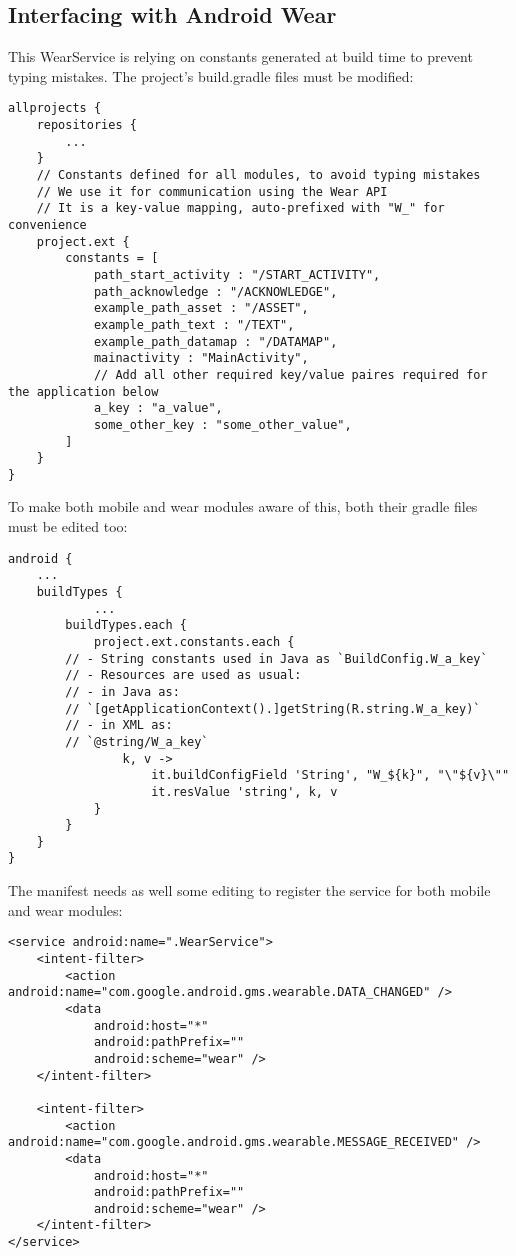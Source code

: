 \documentclass[11pt]{article}
\begin{document}
\subsection{Interfacing with Android Wear}
This WearService is relying on constants generated at build time to prevent typing mistakes. The project’s build.gradle files must be modified:
\lstset{language = Java}
\begin{lstlisting}
allprojects {
    repositories {
        ...
    }
    // Constants defined for all modules, to avoid typing mistakes
    // We use it for communication using the Wear API
    // It is a key-value mapping, auto-prefixed with "W_" for convenience
    project.ext {
        constants = [
            path_start_activity : "/START_ACTIVITY",
            path_acknowledge : "/ACKNOWLEDGE",
            example_path_asset : "/ASSET",
            example_path_text : "/TEXT",
            example_path_datamap : "/DATAMAP",
            mainactivity : "MainActivity",
            // Add all other required key/value paires required for the application below
            a_key : "a_value",
            some_other_key : "some_other_value",
        ]
    }
}
\end{lstlisting}
To make both mobile and wear modules aware of this, both their gradle files must be edited too: 
\lstset{language = Java}
\begin{lstlisting}
android {
    ...
    buildTypes {
            ...
        buildTypes.each {
            project.ext.constants.each {
        // - String constants used in Java as `BuildConfig.W_a_key`
        // - Resources are used as usual:
        // - in Java as:
        // `[getApplicationContext().]getString(R.string.W_a_key)`
        // - in XML as:
        // `@string/W_a_key`
                k, v ->
                    it.buildConfigField 'String', "W_${k}", "\"${v}\""
                    it.resValue 'string', k, v
            }
        }
    }
}
\end{lstlisting}
The manifest needs as well some editing to register the service for both mobile and wear modules: 
\lstset{language = Java}
\begin{lstlisting}
<service android:name=".WearService">
    <intent-filter>
        <action android:name="com.google.android.gms.wearable.DATA_CHANGED" />
        <data
            android:host="*"
            android:pathPrefix=""
            android:scheme="wear" />
    </intent-filter>

    <intent-filter>
        <action android:name="com.google.android.gms.wearable.MESSAGE_RECEIVED" />
        <data
            android:host="*"
            android:pathPrefix=""
            android:scheme="wear" />
    </intent-filter>
</service>
\end{lstlisting}
\end{document}
